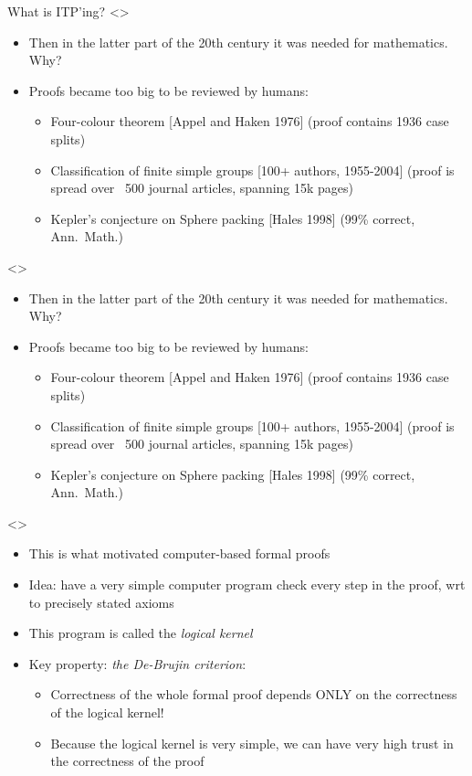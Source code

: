 \documentclass[compress,10pt,xcolor=dvipsnames]{beamer}
\begin{document}
\begin{frame}{What is ITP'ing?}
\note<\verybigproofs>{
\tiny
  \begin{itemize}
  \item Then in the latter part of the 20th century it was needed for mathematics. Why?
  \item Proofs became too big to be reviewed by humans:
    \begin{itemize}
    \item Four-colour theorem [Appel and Haken 1976] (proof contains 1936 case splits)
    \item Classification of finite simple groups [100+ authors, 1955-2004] (proof is spread over ~500 journal articles, spanning 15k pages)
    \item Kepler's conjecture on Sphere packing [Hales 1998] (99\% correct, Ann.\ Math.)
    \end{itemize}
  \end{itemize}
}

\only<\verybigproofs>{
\begin{itemize}
  \item Then in the latter part of the 20th century it was needed for mathematics. Why?
  \item Proofs became too big to be reviewed by humans:
    \begin{itemize}
    \item Four-colour theorem [Appel and Haken 1976] (proof contains 1936 case splits)
    \item Classification of finite simple groups [100+ authors, 1955-2004] (proof is spread over ~500 journal articles, spanning 15k pages)
    \item Kepler's conjecture on Sphere packing [Hales 1998] (99\% correct, Ann.\ Math.)
    \end{itemize}
\end{itemize}
}

\note<\computerbasedformalproofs>{
\tiny
  \begin{itemize}
  \item This is what motivated computer-based formal proofs
  \item Idea: have a very simple computer program check every step in the proof, wrt to precisely stated axioms
  \item This program is called the \emph{logical kernel}
  \item Key property: \emph{the De-Brujin criterion}:
    \begin{itemize}
      \item Correctness of the whole formal proof depends ONLY on the correctness of the logical kernel!
      \item Because the logical kernel is very simple, we can have very high trust in the correctness of the proof
    \end{itemize}
  \end{itemize}
}


\end{frame}
\end{document}
